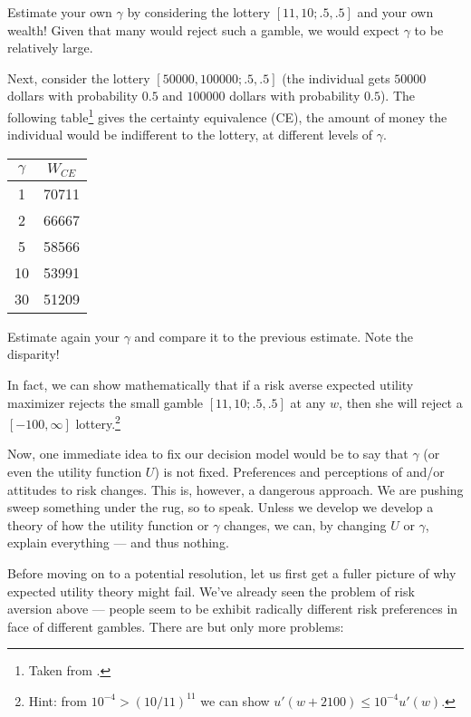 \documentclass[oneside,reqno,letterpaper]{amsart}
\begin{document}
Estimate your own \(\gamma\) by considering the lottery \([11, 10; .5, .5]\) and your own wealth!
Given that many would reject such a gamble, we would expect \(\gamma\) to be relatively large.

Next, consider the lottery \([50000, 100000; .5, .5]\) (the individual gets \(50000\) dollars with probability \(0.5\) and \(100000\) dollars with probability \(0.5\)).
The following table\footnote{Taken from \textcite{Schilbach2020Lecture}.} gives the certainty equivalence (CE), the amount of money the individual would be indifferent to the lottery, at different levels of \(\gamma\).

\begin{table}[H]
\centering
\begin{tabular}{ c c } 
  \(\gamma\) & \(W_{CE}\) \\ 
\hline
  1 & \num{70711} \\ 
  2 & \num{66667} \\ 
  5 & \num{58566} \\ 
  10 & \num{53991} \\ 
  30 & \num{51209} \\ 
\end{tabular}
\end{table}

Estimate again your \(\gamma\) and compare it to the previous estimate.
Note the disparity!

In fact, we can show mathematically that if a risk averse expected utility maximizer rejects the small gamble \([11, 10; .5, .5]\) at any \(w\), then she will reject a \([-100, \infty]\) lottery.\footnote{
  Hint: from \(10^{-4} > (10 / 11)^{11}\) we can show \(u'(w + 2100) \leq 10^{-4} u'(w)\).
}

Now, one immediate idea to fix our decision model would be to say that \(\gamma\) (or even the utility function \(U\)) is not fixed.
Preferences and perceptions of and/or attitudes to risk changes.
This is, however, a dangerous approach.
We are pushing sweep something under the rug, so to speak.
Unless we develop we develop a theory of how the utility function or \(\gamma\) changes, we can, by changing \(U\) or \(\gamma\), explain everything --- and thus nothing.

Before moving on to a potential resolution, let us first get a fuller picture of why expected utility theory might fail.
We've already seen the problem of risk aversion above --- people seem to be exhibit radically different risk preferences in face of different gambles.
There are but only more problems:
\end{document}
